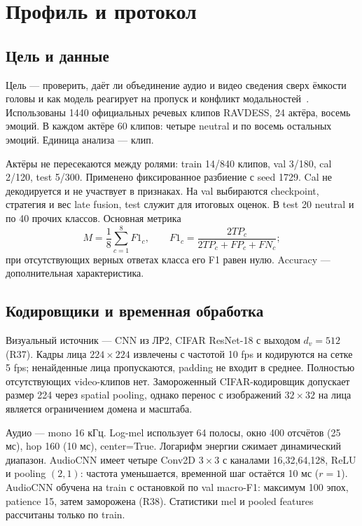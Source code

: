 \section{Профиль и протокол}
\subsection{Цель и данные}
Цель --- проверить, даёт ли объединение аудио и видео сведения сверх ёмкости головы и как модель реагирует на пропуск и конфликт модальностей~\cite{teacher}. Использованы 1440 официальных речевых клипов RAVDESS, 24 актёра, восемь эмоций. В каждом актёре 60 клипов: четыре neutral и по восемь остальных эмоций. Единица анализа --- клип.

Актёры не пересекаются между ролями: train 14/840 клипов, val 3/180, cal 2/120, test 5/300. Применено фиксированное разбиение с seed 1729. Cal не декодируется и не участвует в признаках. На val выбираются checkpoint, стратегия и вес late fusion, test служит для итоговых оценок. В test 20 neutral и по 40 прочих классов. Основная метрика
\begin{equation}M=\frac18\sum_{c=1}^8 F1_c,\qquad F1_c=\frac{2TP_c}{2TP_c+FP_c+FN_c};\end{equation}
при отсутствующих верных ответах класса его F1 равен нулю. Accuracy --- дополнительная характеристика.

\subsection{Кодировщики и временная обработка}
Визуальный источник --- CNN из ЛР2, CIFAR ResNet-18 с выходом $d_v=512$ (R37). Кадры лица $224\times224$ извлечены с частотой 10 fps и кодируются на сетке 5 fps; ненайденные лица пропускаются, padding не входит в среднее. Полностью отсутствующих video-клипов нет. Замороженный CIFAR-кодировщик допускает размер 224 через spatial pooling, однако перенос с изображений $32\times32$ на лица является ограничением домена и масштаба.

Аудио --- mono 16 кГц. Log-mel использует 64 полосы, окно 400 отсчётов (25 мс), hop 160 (10 мс), center=True. Логарифм энергии сжимает динамический диапазон. AudioCNN имеет четыре Conv2D $3\times3$ с каналами 16,32,64,128, ReLU и pooling $(2,1)$: частота уменьшается, временной шаг остаётся 10 мс ($r=1$). AudioCNN обучена на train с остановкой по val macro-F1: максимум 100 эпох, patience 15, затем заморожена (R38). Статистики mel и pooled features рассчитаны только по train.

